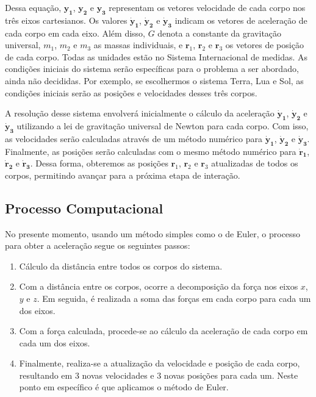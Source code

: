 \documentclass[a4paper, 12pt]{article} %
\begin{document}
Dessa equação, $\mathbf{y_1}$, $\mathbf{y_2}$ e $\mathbf{y_3}$ representam os vetores velocidade de cada corpo nos três eixos cartesianos. Os valores $\mathbf{\dot{y}_1}$, $\mathbf{\dot{y}_2}$ e $\mathbf{\dot{y}_3}$ indicam os vetores de aceleração de cada corpo em cada eixo. Além disso, $G$ denota a constante da gravitação universal, $m_1$, $m_2$ e $m_3$ as massas individuais, e $\mathbf{r}_1$, $\mathbf{r}_2$ e $\mathbf{r}_3$ os vetores de posição de cada corpo. Todas as unidades estão no Sistema Internacional de medidas. As condições iniciais do sistema serão específicas para o problema a ser abordado, ainda não decididas. Por exemplo, se escolhermos o sistema Terra, Lua e Sol, as condições iniciais serão as posições e velocidades desses três corpos.

A resolução desse sistema envolverá inicialmente o cálculo da aceleração $\mathbf{\dot{y}_1}$, $\mathbf{\dot{y}_2}$ e $\mathbf{\dot{y}_3}$ utilizando a lei de gravitação universal de Newton para cada corpo. Com isso, as velocidades serão calculadas através de um método numérico para $\mathbf{\dot{y}_1}$, $\mathbf{\dot{y}_2}$ e $\mathbf{\dot{y}_3}$. Finalmente, as posições serão calculadas com o mesmo método numérico para $\mathbf{\dot{r}_1}$, $\mathbf{\dot{r}_2}$ e $\mathbf{\dot{r}_3}$. Dessa forma, obteremos as posições $\mathbf{r}_1$, $\mathbf{r}_2$ e $\mathbf{r}_3$ atualizadas de todos os corpos, permitindo avançar para a próxima etapa de interação.

\subsection{Processo Computacional}

No presente momento, usando um método simples como o de Euler, o processo para obter a aceleração segue os seguintes passos:
\begin{enumerate}\label{passos}
    \item Cálculo da distância entre todos os corpos do sistema.
    \item Com a distância entre os corpos, ocorre a decomposição da força nos eixos ${x}$, ${y}$ e ${z}$. Em seguida, é realizada a soma das forças em cada corpo para cada um dos eixos.
    \item Com a força calculada, procede-se ao cálculo da aceleração de cada corpo em cada um dos eixos.
    \item Finalmente, realiza-se a atualização da velocidade e posição de cada corpo, resultando em 3 novas velocidades e 3 novas posições para cada um. Neste ponto em específico é que aplicamos o método de Euler.
\end{enumerate}
\end{document}
